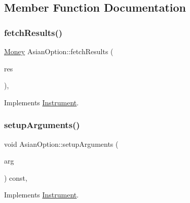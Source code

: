 \subsection{Member Function Documentation}
\hypertarget{class_asian_option_a99cd9956b73d99a64748c913dcccd6ea}{}\label{class_asian_option_a99cd9956b73d99a64748c913dcccd6ea} 
\subsubsection{\texorpdfstring{fetch\+Results()}{fetchResults()}}
{\footnotesize\ttfamily \hyperlink{_name_def_8h_a5a9d48c16a694e9a2d9f1eca730dc8c5}{Money} Asian\+Option\+::fetch\+Results (\begin{DoxyParamCaption}\item[{\hyperlink{class_pricing_engine_1_1_results}{Pricing\+Engine\+::\+Results} $\ast$const}]{res }\end{DoxyParamCaption})\hspace{0.3cm}{\ttfamily [override]}, {\ttfamily [virtual]}}



Implements \hyperlink{class_instrument_a381f093402f789ad7c0ffecd233167dc}{Instrument}.

\hypertarget{class_asian_option_a475cbd83529df369b371ee44f63cdd08}{}\label{class_asian_option_a475cbd83529df369b371ee44f63cdd08} 
\subsubsection{\texorpdfstring{setup\+Arguments()}{setupArguments()}}
{\footnotesize\ttfamily void Asian\+Option\+::setup\+Arguments (\begin{DoxyParamCaption}\item[{\hyperlink{class_pricing_engine_1_1_arguments}{Pricing\+Engine\+::\+Arguments} $\ast$}]{arg }\end{DoxyParamCaption}) const\hspace{0.3cm}{\ttfamily [override]}, {\ttfamily [virtual]}}



Implements \hyperlink{class_instrument_ac0f78fd32a360abde0c31b5bc01c7e67}{Instrument}.



